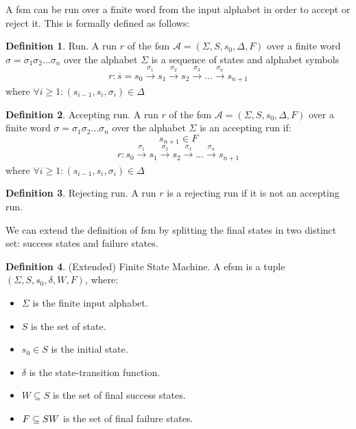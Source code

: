 \documentclass[12pt]{article}
\theoremstyle{definition}
\newtheorem{definition}{Definition}[section]
\theoremstyle{definition}
\theoremstyle{remark}
\newcommand{\A}{\mathcal{A}}
\begin{document}
A \gls{fsm} can be run over a finite word from the input alphabet in order to accept or reject it. This is formally defined as follows:

\theoremstyle{definition}
\begin{definition}{Run.} A run $r$ of the \gls{fsm} $\A = (\Sigma, S, s_{0}, \Delta, F)$ over a finite word $\sigma = \sigma_1 \sigma_2 ... \sigma_n$ over the alphabet $\Sigma$ is a sequence of states and alphabet symbols
$$r: \overline{s} = s_0 \xrightarrow[]{\sigma_1} s_1 \xrightarrow[]{\sigma_2} s_2 \xrightarrow[]{\sigma_3} ... \xrightarrow[]{\sigma_n} s_{n+1}$$ where $\forall i \ge 1: (s_{i-1}, s_i, \sigma_i) \in \Delta$
\end{definition}

\theoremstyle{definition}
\begin{definition}{Accepting run.} A run $r$ of the \gls{fsm} $\A = (\Sigma, S, s_{0}, \Delta, F)$ over a finite word $\sigma = \sigma_1 \sigma_2 ... \sigma_n$ over the alphabet $\Sigma$ is an accepting run if:
$$s_{n+1} \in F$$
$$r: s_0 \xrightarrow[]{\sigma_1} s_1 \xrightarrow[]{\sigma_2} s_2 \xrightarrow[]{\sigma_3} ... \xrightarrow[]{\sigma_n} s_{n+1}$$ where $\forall i \ge 1: (s_{i-1}, s_i, \sigma_i) \in \Delta$
\end{definition}

\theoremstyle{definition}
\begin{definition}{Rejecting run.} A run $r$ is a rejecting run if it is not an accepting run.
\end{definition}

We can extend the definition of \gls{fsm} by splitting the final states in two distinct set: success states and failure states.

\theoremstyle{definition}
\begin{definition}{(Extended) Finite State Machine.} A \gls{efsm} is a tuple $(\Sigma, S, s_{0},\delta, W, F)$, where:
\begin{itemize}
\item $\Sigma$ is the finite input alphabet.
\item $S$ is the set of state.
\item $s_{0} \in S$ is the initial state.
\item $\delta$ is the state-transition function.
\item $W \subseteq S$ is the set of final success states.
\item $F \subseteq S \\ W$ is the set of final failure states.
\end{itemize}
\end{definition}
\end{document}
